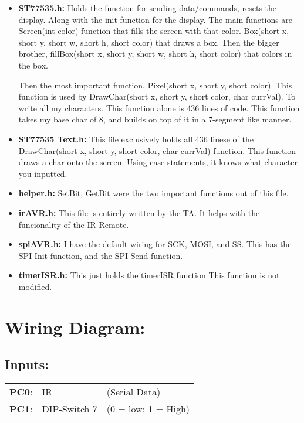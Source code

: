 \documentclass[12pt]{article}
\begin{document}
\begin{itemize}
  \item \textbf{ST77535.h:}
      Holds the function for sending data/commands, resets the display.
      Along with the init function for the display. The main functions are
      Screen(int color) function that fills the screen with that color.
Box(short x, short y, short w, short h, short color) that draws a box. 
Then the bigger brother, fillBox(short x, short y, short w, short h, short color) 
that colors in the box. 


Then the most important function, Pixel(short x, short y, short color).
This function is used by DrawChar(short x, short y, short color, char currVal).
To write all my characters. This function alone is 436 lines of code. 
This function takes my base char of 8, and builds on top of it in a 7-segment like manner.
  \item \textbf{ST77535 Text.h:}
    This file exclusively holds all 436 linese of 
    the DrawChar(short x, short y, short color, char currVal) function. 
    This function draws a char onto the screen. Using case statements, it 
    knows what character you inputted.
  \item \textbf{helper.h:} SetBit, GetBit were the two important
    functions out of this file.
  \item \textbf{irAVR.h:} This file is entirely
    written by the TA. It helps with the funcionality of the IR Remote.
  \item\textbf{spiAVR.h:}
    I have the default wiring for SCK, MOSI, and SS. 
    This has the SPI Init function, and the SPI Send function.
  \item\textbf{timerISR.h:} 
    This just holds the timerISR function
    This function is not modified.
\end{itemize}

\section{Wiring Diagram:}

\subsection*{Inputs:}
\begin{tabular}{ l l l }
   \textbf{PC0}: & IR & \quad (Serial Data) \\
   \textbf{PC1}: & DIP-Switch 7 & \quad (0 = low; 1 = High) \\
\end{tabular}
\end{document}
